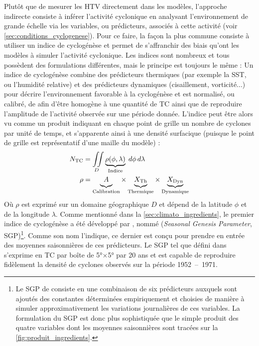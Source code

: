 \documentclass[../main.tex]{subfiles}
\begin{document}
Plutôt que de mesurer les HTV directement dans les modèles, l'approche indirecte consiste à inférer l'activité cyclonique en analysant l'environnement de grande
échelle via les variables, ou prédicteurs, associés à cette activité (voir \cref{sec:conditions_cyclogenese}). Pour ce faire, la façon la plus commune consiste
à utiliser un indice de cyclogénèse \parencite{gray_tropical_1975} et permet de s'affranchir des biais qu'ont les modèles à simuler l'activité cyclonique. Les
indices sont nombreux et tous possèdent des formulations différentes, mais le principe est toujours le même : Un indice de cyclogénèse combine des prédicteurs
thermiques (par exemple la SST, ou l'humidité relative) et des prédicteurs dynamiques (cisaillement, vorticité...) pour décrire l'environnement favorable à la
cyclogénèse et est normalisé, ou calibré, de afin d'être homogène à une quantité de TC ainsi que de reproduire l'amplitude de l'activité observée sur une
période donnée. L'indice peut être alors vu comme un produit indiquant en chaque point de grille un nombre de cyclones par unité de temps, et s'apparente ainsi
à une densité surfacique (puisque le point de grille est représentatif d'une maille du modèle) :
%
\begin{align*}
    N_{\text{TC}} &= \iint\limits_{D} \underbrace{\rho(\phi, \lambda)}_{\text{Indice}} \; d\phi \, d\lambda \\
    \rho &= \underbrace{\vphantom{X_{\text{Dyn}}}A}_{\text{Calibration}} \times \underbrace{\vphantom{X_{\text{Dyn}}}X_{\text{Th}}}_{\text{Thermique}} \times
    \underbrace{X_{\text{Dyn}}}_{\text{Dynamique}}
\end{align*}
%
Où $\rho$ est exprimé sur un domaine géographique $D$ et dépend de la latitude $\phi$ et de la longitude $\lambda$. Comme mentionné dans la
\cref{sec:climato_ingredients}, le premier indice de cyclogénèse a été développé par \textcite{gray_tropical_1975}, nommé  (\textit{Seasonal Genesis Parameter}, SGP)\footnote{Le SGP de \textcite{gray_tropical_1975} consiste en une combinaison de six prédicteurs auxquels
sont ajoutés des constantes déterminées empiriquement et choisies de manière à simuler approximativement les variations journalières de ces variables.
La formulation du SGP est donc plus sophistiquée que le simple produit des quatre variables dont les moyennes saisonnières sont tracées sur la
\cref{fig:produit_ingredients}.}. Comme son nom l'indique, ce dernier est conçu pour prendre en entrée des moyennes saisonnières de ces prédicteurs. Le SGP
tel que défini dans \textcite{gray_tropical_1975} s'exprime en TC par boîte de \ang{5}$\times$\ang{5} par 20 ans et est capable de reproduire fidèlement la
densité de cyclones observés sur la période \num{1952}~--~\num{1971}.
\end{document}
